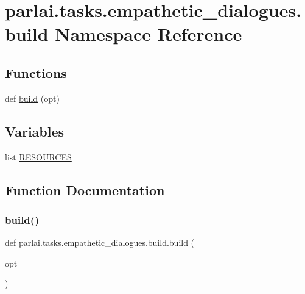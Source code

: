 \hypertarget{namespaceparlai_1_1tasks_1_1empathetic__dialogues_1_1build}{}\section{parlai.\+tasks.\+empathetic\+\_\+dialogues.\+build Namespace Reference}
\label{namespaceparlai_1_1tasks_1_1empathetic__dialogues_1_1build}
\subsection*{Functions}
\begin{DoxyCompactItemize}
\item 
def \hyperlink{namespaceparlai_1_1tasks_1_1empathetic__dialogues_1_1build_a01521757f3dbc3edcfe2f9ca39027688}{build} (opt)
\end{DoxyCompactItemize}
\subsection*{Variables}
\begin{DoxyCompactItemize}
\item 
list \hyperlink{namespaceparlai_1_1tasks_1_1empathetic__dialogues_1_1build_a9d2945e43f4f4d167ef6d78275f37490}{R\+E\+S\+O\+U\+R\+C\+ES}
\end{DoxyCompactItemize}


\subsection{Function Documentation}
\mbox{\label{namespaceparlai_1_1tasks_1_1empathetic__dialogues_1_1build_a01521757f3dbc3edcfe2f9ca39027688}} 
\subsubsection{\texorpdfstring{build()}{build()}}
{\footnotesize\ttfamily def parlai.\+tasks.\+empathetic\+\_\+dialogues.\+build.\+build (\begin{DoxyParamCaption}\item[{}]{opt }\end{DoxyParamCaption})}



